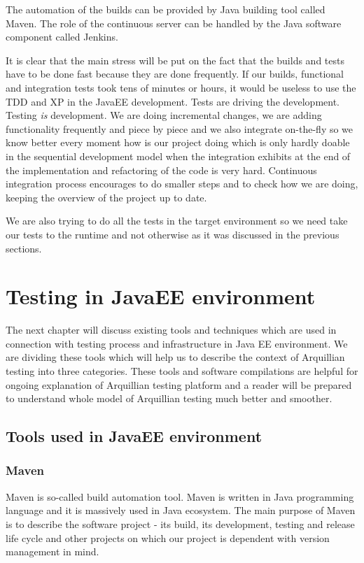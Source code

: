 \documentclass[12pt,final,oneside]{fithesis}
\begin{document}
The automation of the builds can be provided by Java building tool called Maven. The role of the continuous server can be handled by the Java software component called Jenkins.

It is clear that the main stress will be put on the fact that the builds and tests have to be done fast because they are done frequently. If our builds, functional and integration tests took tens of minutes or hours, it would be useless to use the TDD and XP in the JavaEE development. Tests are driving the development. Testing \emph{is} development. We are doing incremental changes, we are adding functionality frequently and piece by piece and we also integrate on-the-fly so we know better every moment how is our project doing which is only hardly doable in the sequential development model when the integration exhibits at the end of the implementation and refactoring of the code is very hard. Continuous integration process encourages to do smaller steps and to check how we are doing, keeping the overview of the project up to date.

We are also trying to do all the tests in the target environment so we need take our tests to the runtime and not otherwise as it was discussed in the previous sections.

\chapter{Testing in JavaEE environment}

The next chapter will discuss existing tools and techniques which are used in connection with testing process and infrastructure in Java EE environment. We are dividing these tools which will help us to describe the context of Arquillian testing into three categories. These tools and software compilations are helpful for ongoing explanation of Arquillian testing platform and a reader will be prepared to understand whole model of Arquillian testing much better and smoother.

	\section{Tools used in JavaEE environment}
	
		\subsection{Maven}

Maven is so-called build automation tool. Maven is written in Java programming language and it is massively used in Java ecosystem. The main purpose of Maven is to describe the software project - its build, its development, testing and release life cycle and other projects on which our project is dependent with version management in mind.
\end{document}
